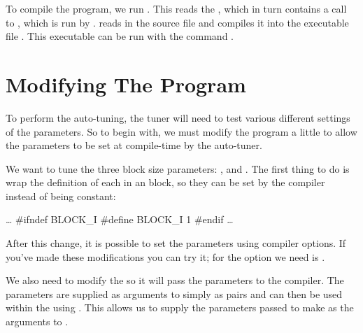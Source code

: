 \documentclass[a4paper]{article}
\begin{document}
To compile the program, we run . This reads the 
, which in turn contains a call to , which is 
run by .  reads in the source file 
 and compiles it into the executable file . 
This executable can be run with the command .




\section{Modifying The Program}
To perform the auto-tuning, the tuner will need to test various different 
settings of the parameters. So to begin with, we must modify the program a 
little to allow the parameters to be set at compile-time by the auto-tuner.


We want to tune the three block size parameters: , 
 and . The first thing to do is wrap the definition 
of each in an  block, so they can be set by the 
compiler instead of being constant:
\begin{Code}[numbers=none, commandchars=\\\{\}]
\ldots
#ifndef BLOCK_I
    #define BLOCK_I 1
#endif
\ldots
\end{Code}



After this change, it is possible to set the parameters using compiler 
options. If you've made these modifications you can try it; for  
the option we need is .
\begin{Term}
\end{Term}




We also need to modify the  so it will pass the 
parameters to the compiler. The parameters are supplied as arguments to 
 simply as  pairs and can then be used 
within the  using . This allows us 
to supply the parameters passed to make as the  arguments to 
.
\end{document}
